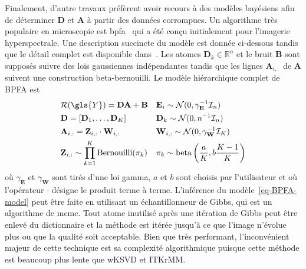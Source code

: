 Finalement, d'autre travaux préfèrent avoir recours à des modèles bayésiens afin de déterminer $\mathbf{D}$ et $\mathbf{A}$ à partir des données corrompues. Un algorithme très populaire en microscopie est \gls{bpfa}~\cite{xing2012siam} qui a été conçu initialement pour l'imagerie hyperspectrale. Une description succincte du modèle est donnée ci-dessous tandis que le détail complet est disponible dans~\cite{xing2012siam}. Les atomes $\mathbf{D}_k\in\mathbb{R}^n$ et le bruit $\mathbf{B}$ sont supposés suivre des lois gaussiennes indépendantes tandis que les lignes $\mathbf{A}_{i, :}$ de $\mathbf{A}$ suivent une construction beta-bernouilli. Le modèle hiérarchique complet de BPFA est
\begin{equation}\label{eq-BPFA-model}
\begin{aligned}
    &\mathcal{R}(\gls{Y}) = \mathbf{D A + B} 
    &&\mathbf{E}_i\sim\mathcal{N}(0, \gamma_\mathbf{E}^{-1}\mathcal{I}_n)\\
    &\mathbf{D} = [\mathbf{D}_1, \dots, \mathbf{D}_K]
    &&\mathbf{D}_k\sim\mathcal{N}(0, n^{-1}\mathcal{I}_n)\\
    &\mathbf{A}_{i, :} = \mathbf{Z}_{i, :}\cdot \mathbf{W}_{i, :}
    &&\mathbf{W}_{i, :}\sim\mathcal{N}(0, \gamma_\mathbf{W}^{-1}\mathcal{I}_K)\\
    &\mathbf{Z}_{i, :}\sim \prod_{k=1}^{K}\mathrm{Bernouilli}(\pi_k)
    &&\pi_k\sim\mathrm{beta}\left( \frac{a}{K}, b\frac{K-1}{K} \right)
\end{aligned}
\end{equation}
où $\gamma_\mathbf{E}$ et $\gamma_\mathbf{W}$ sont tirés d'une loi gamma, $a$ et $b$ sont choisis par l'utilisateur et où l'opérateur $\cdot$ désigne le produit terme à terme. L'inférence du modèle~\eqref{eq-BPFA-model} peut être faite en utilisant un échantillonneur de Gibbs, qui est un algorithme de \gls{mcmc}. Tout atome inutilisé après une itération de Gibbs peut être enlevé du dictionnaire et la méthode est itérée jusqu'à ce que l'image n'évolue plus ou que la qualité soit acceptable. Bien que très performant, l'inconvénient majeur de cette technique est sa complexité algorithmique puisque cette méthode est beaucoup plus lente que wKSVD et ITKrMM.

